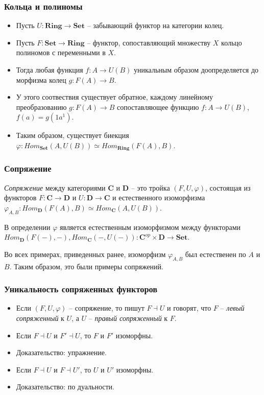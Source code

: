 \documentclass{beamer}
\theoremstyle{definition}
\newcommand{\cat}[1]{\mathbf{#1}}
\renewcommand{\C}{\cat{C}}
\newcommand{\D}{\cat{D}}
\newcommand{\Set}{\cat{Set}}
\newcommand{\Ring}{\cat{Ring}}
\begin{document}
\begin{frame}
\frametitle{Кольца и полиномы}
\begin{itemize}
\item Пусть $U : \Ring \to \Set$ -- забывающий функтор на категории колец.
\item Пусть $F : \Set \to \Ring$ -- функтор, сопоставляющий множеству $X$ кольцо полиномов с переменными в $X$.
\item Тогда любая функция $f : A \to U(B)$ уникальным образом доопределяется до морфизма колец $g : F(A) \to B$.
\item У этого соотвествия существует обратное, каждому линейному преобразованию $g : F(A) \to B$ сопоставляющее функцию $f : A \to U(B)$, $f(a) = g(1 a^1)$.
\item Таким образом, существует биекция $\varphi : Hom_\Set(A, U(B)) \simeq Hom_\Ring(F(A), B)$.
\end{itemize}
\end{frame}

\begin{frame}
\frametitle{Сопряжение}
\begin{defn}
\emph{Сопряжение} между категориями $\C$ и $\D$ -- это тройка $(F, U, \varphi)$, состоящая из функторов $F : \C \to \D$ и $U : \D \to \C$ и естественного изоморфизма $\varphi_{A,B} : Hom_\D(F(A), B) \simeq Hom_\C(A, U(B))$.
\end{defn}

\vspace{\baselineskip}

В определении $\varphi$ является естественным изоморфизмом между функторами $Hom_\D(F(-), -), Hom_\C(-, U(-)) : \C^{op} \times \D \to \Set$.

\vspace{\baselineskip}

Во всех примерах, приведенных ранее, изоморфизм $\varphi_{A,B}$ был естественен по $A$ и $B$.
Таким образом, это были примеры сопряжений.
\end{frame}

\begin{frame}
\frametitle{Уникальность сопряженных функторов}
\begin{itemize}
\item Если $(F, U, \varphi)$ -- сопряжение, то пишут $F \dashv U$ и говорят, что $F$ -- \emph{левый сопряженный} к $U$, а $U$ -- \emph{правый сопряженный} к $F$.
\item Если $F \dashv U$ и $F' \dashv U$, то $F$ и $F'$ изоморфны.
\item Доказательство: упражнение.
\item Если $F \dashv U$ и $F \dashv U'$, то $U$ и $U'$ изоморфны.
\item Доказательство: по дуальности.
\end{itemize}
\end{frame}
\end{document}
